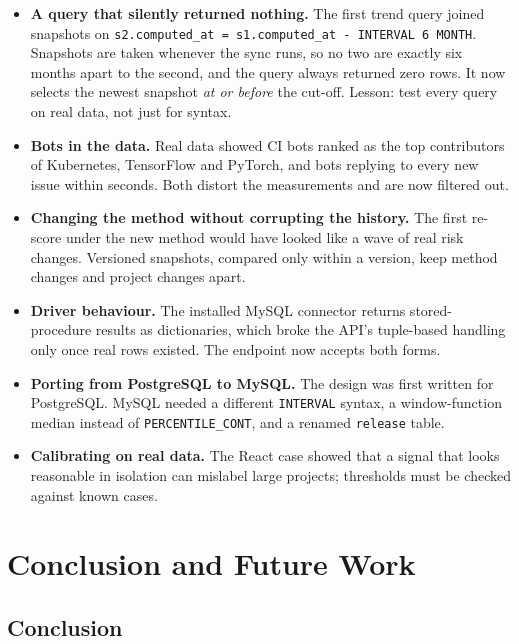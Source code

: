\documentclass[11pt,a4paper]{report}
\begin{document}
\begin{itemize}
  \item \textbf{A query that silently returned nothing.} The first trend query
        joined snapshots on \texttt{s2.computed\_at = s1.computed\_at - INTERVAL
        6 MONTH}. Snapshots are taken whenever the sync runs, so no two are
        exactly six months apart to the second, and the query always returned
        zero rows. It now selects the newest snapshot \emph{at or before} the
        cut-off. Lesson: test every query on real data, not just for syntax.
  \item \textbf{Bots in the data.} Real data showed CI bots ranked as the top
        contributors of Kubernetes, TensorFlow and PyTorch, and bots replying to
        every new issue within seconds. Both distort the measurements and are
        now filtered out.
  \item \textbf{Changing the method without corrupting the history.} The first
        re-score under the new method would have looked like a wave of real
        risk changes. Versioned snapshots, compared only within a version,
        keep method changes and project changes apart.
  \item \textbf{Driver behaviour.} The installed MySQL connector returns
        stored-procedure results as dictionaries, which broke the API's
        tuple-based handling only once real rows existed. The endpoint now
        accepts both forms.
  \item \textbf{Porting from PostgreSQL to MySQL.} The design was first written
        for PostgreSQL. MySQL needed a different \texttt{INTERVAL} syntax, a
        window-function median instead of \texttt{PERCENTILE\_CONT}, and a
        renamed \texttt{release} table.
  \item \textbf{Calibrating on real data.} The React case showed that a signal
        that looks reasonable in isolation can mislabel large projects;
        thresholds must be checked against known cases.
\end{itemize}

\chapter{Conclusion and Future Work}
\label{ch:conclusion}

\section{Conclusion}
\end{document}
